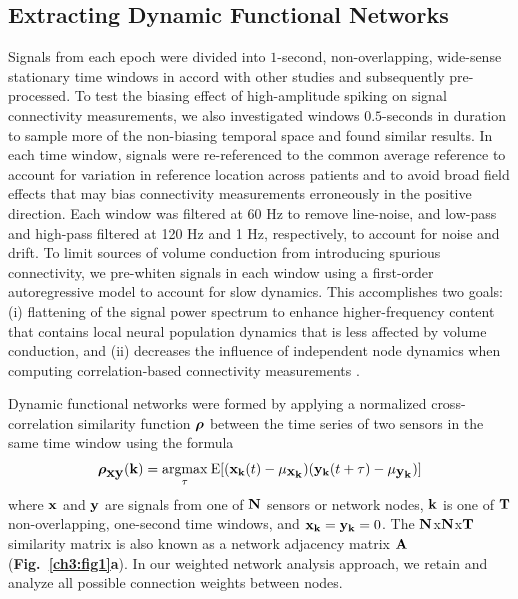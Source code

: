 \subsection{Extracting Dynamic Functional Networks}
Signals from each epoch were divided into $1$-second, non-overlapping, wide-sense stationary time windows in accord with other studies \cite{kramer2010coalescence} and subsequently pre-processed. To test the biasing effect of high-amplitude spiking on signal connectivity measurements, we also investigated windows $0.5$-seconds in duration to sample more of the non-biasing temporal space and found similar results. In each time window, signals were re-referenced to the common average reference \cite{kramer2010coalescence, towle1999electrocorticographic} to account for variation in reference location across patients and to avoid broad field effects that may bias connectivity measurements erroneously in the positive direction. Each window was filtered at 60 Hz to remove line-noise, and low-pass and high-pass filtered at 120 Hz and 1 Hz, respectively, to account for noise and drift. To limit sources of volume conduction from introducing spurious connectivity, we pre-whiten signals in each window using a first-order autoregressive model to account for slow dynamics. This accomplishes two goals: (i) flattening of the signal power spectrum to enhance higher-frequency content that contains local neural population dynamics that is less affected by volume conduction, and (ii) decreases the influence of independent node dynamics when computing correlation-based connectivity measurements \cite{towle1999electrocorticographic, bullmore2001colored, lund2006non-white, arbabshirani2014impact}.

Dynamic functional networks were formed by applying a normalized cross-correlation similarity function $\boldsymbol{\displaystyle \rho}$ between the time series of two sensors in the same time window using the formula
    \begin{eqnarray}
        \boldsymbol{\displaystyle \rho}_{\mathbf{\displaystyle xy}}(\mathbf{\displaystyle k}) = \underset{\tau}{\operatorname{argmax}}\:{\mathrm{E}}[(\mathbf{\displaystyle x_k}(t) - \mu_{\mathbf{\displaystyle x_k}})(\mathbf{\displaystyle y_k}(t+\tau) - \mu_{\mathbf{\displaystyle y_k}})]
    \end{eqnarray}
    where $\mathbf{\displaystyle x}$ and $\mathbf{\displaystyle y}$ are signals from one of $\mathbf{\displaystyle N}$ sensors or network nodes, $\mathbf{\displaystyle k}$ is one of $\mathbf{\displaystyle T}$ non-overlapping, one-second time windows, and $\mathbf{\displaystyle x_{k}}=\mathbf{\displaystyle y_{k}}=0$. The $\mathbf{\displaystyle N}$x$\mathbf{\displaystyle N}$x$\mathbf{\displaystyle T}$ similarity matrix is also known as a network adjacency matrix $\mathbf{\displaystyle A}$ (\textbf{Fig.~\ref{ch3:fig1}a}). In our weighted network analysis approach, we retain and analyze all possible connection weights between nodes.

